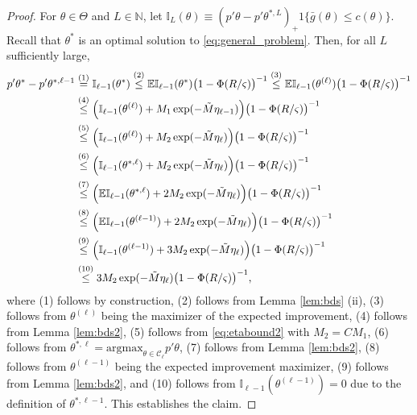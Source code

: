\documentclass[letterpaper,11pt]{article}
\theoremstyle{myplain}
\theoremstyle{mydefinition}
\theoremstyle{myremark}
\newcommand{\EI}{\mathbb{EI}}
\numberwithin{equation}{section}
\numberwithin{figure}{section}
\begin{document}
\begin{appendix}
\begin{proof}
 For $\theta\in\Theta$ and $L\in\mathbb N$, let $\mathbb{I}_L(\theta)\equiv (p'\theta-p'\theta^{*,L})_+1\{\bar g(\theta)\le c(\theta)\}.$
 Recall that $\theta^*$ is an optimal solution to \eqref{eq:general_problem}.  Then, for all $L$ sufficiently large,
\begin{align}
p'\theta^*-p'\theta^{*,\ell-1}&\stackrel{(1)}{=} \mathbb{I}_{\ell-1}(\theta^*)	
\stackrel{(2)}{\le} \EI_{\ell-1}(\theta^*)\bigl(1-\Phi(R/\varsigma)\bigr)^{-1} 
\stackrel{(3)}{\le} \EI_{\ell-1}(\theta^{(\ell)})\bigl(1-\Phi(R/\varsigma)\bigr)^{-1}\notag\\
&\stackrel{(4)}{\le} \Bigl(\mathbb{I}_{\ell-1}(\theta^{(\ell)})+M_1 \exp(-\tilde M\eta_{\ell-1})\Bigr)\bigl(1-\Phi(R/\varsigma)\bigr)^{-1} \notag\\
&\stackrel{(5)}{\le} \Bigl(\mathbb{I}_{\ell-1}(\theta^{(\ell)})+M_2 \exp(-\tilde M\eta_{\ell})\Bigr)\bigl(1-\Phi(R/\varsigma)\bigr)^{-1} \notag\\
  &\stackrel{(6)}{\le} \Bigl(\mathbb{I}_{\ell-1}(\theta^{*,\ell})+M_2 \exp(-\tilde M\eta_{\ell})\Bigr)\bigl(1-\Phi(R/\varsigma)\bigr)^{-1}\notag\\
  &\stackrel{(7)}{\le} \Bigl(\mathbb{EI}_{\ell-1}(\theta^{*,\ell})+2M_2 \exp(-\tilde M\eta_{\ell})\Bigr)\bigl(1-\Phi(R/\varsigma)\bigr)^{-1}\notag\\
  &\stackrel{(8)}{\le} \Bigl(\mathbb{EI}_{\ell-1}(\theta^{(\ell-1)})+2M_2 \exp(-\tilde M\eta_{\ell})\Bigr)\bigl(1-\Phi(R/\varsigma)\bigr)^{-1}\notag\\
  &\stackrel{(9)}{\le} \Bigl(\mathbb{I}_{\ell-1}(\theta^{(\ell-1)})+3M_2 \exp(-\tilde M\eta_{\ell})\Bigr)\bigl(1-\Phi(R/\varsigma)\bigr)^{-1}\notag\\
  &\stackrel{(10)}{\le} 3M_2 \exp(-\tilde M\eta_{\ell})\bigl(1-\Phi(R/\varsigma)\bigr)^{-1}\notag,
\end{align}
where (1) follows by construction, (2) follows from  Lemma \ref{lem:bds} (ii), (3) follows from $\theta^{(\ell)}$ being the maximizer of the expected improvement, (4) follows from Lemma \ref{lem:bds2},
 (5) follows from \eqref{eq:etabound2} with $M_2=CM_1$, (6) follows from $\theta^{*,\ell}=\text{argmax}_{\theta\in \mathcal C_\ell} p'\theta$, (7) follows from Lemma \ref{lem:bds2}, (8) follows from $\theta^{(\ell-1)}$ being the expected improvement maximizer, (9) follows from Lemma \ref{lem:bds2}, and (10) follows from $\mathbb{I}_{\ell-1}(\theta^{(\ell-1)})=0$
 due to the definition of $\theta^{*,\ell-1}$. This establishes the claim.
\end{proof}


\end{appendix}
\end{document}
